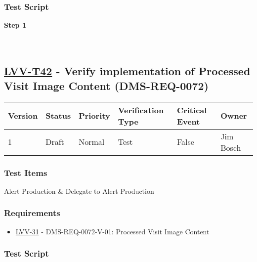 \hypertarget{test-script-131}{%
\subsubsection{Test Script}\label{test-script-131}}

\textbf{Step 1}\\
~\\
~\\

\hypertarget{lvv-t42---verify-implementation-of-processed-visit-image-content-dms-req-0072}{%
\subsection{\texorpdfstring{\href{https://jira.lsstcorp.org/secure/Tests.jspa\#/testCase/LVV-T42}{LVV-T42}
- Verify implementation of Processed Visit Image Content
(DMS-REQ-0072)}{LVV-T42 - Verify implementation of Processed Visit Image Content (DMS-REQ-0072)}}\label{lvv-t42---verify-implementation-of-processed-visit-image-content-dms-req-0072}}

\begin{longtable}[]{@{}llllll@{}}
\toprule
Version & Status & Priority & Verification Type & Critical Event &
Owner\tabularnewline
\midrule
\endhead
1 & Draft & Normal & Test & False & Jim Bosch\tabularnewline
\bottomrule
\end{longtable}

\hypertarget{test-items-131}{%
\subsubsection{Test Items}\label{test-items-131}}

Alert Production \& Delegate to Alert Production

\hypertarget{requirements-132}{%
\subsubsection{Requirements}\label{requirements-132}}

\begin{itemize}
\tightlist
\item
  \href{https://jira.lsstcorp.org/browse/LVV-31}{LVV-31} -
  DMS-REQ-0072-V-01: Processed Visit Image Content
\end{itemize}

\hypertarget{test-script-132}{%
\subsubsection{Test Script}\label{test-script-132}}

